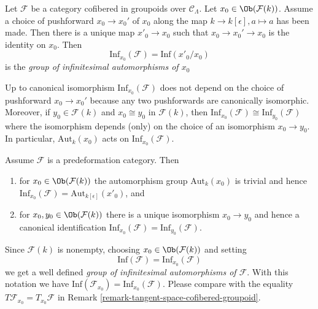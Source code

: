 \begin{definition}
\label{definition-infinitesimal-auts}
Let $\mathcal{F}$ be a category cofibered in groupoids over $\mathcal
C_\Lambda$. Let $x_0 \in \Ob(\mathcal{F}(k))$. Assume a choice of
pushforward $x_0 \to x_0'$ of $x_0$ along the map
$k \to k[\epsilon], a \mapsto a$ has been made.
Then there is a unique map $x'_0 \to x_0$ such that
$x_0 \to x_0' \to x_0$ is the identity on $x_0$.
Then
$$
\text{Inf}_{x_0}(\mathcal F) = \text{Inf}(x'_0/x_0)
$$
is the {\it group of infinitesimal automorphisms of $x_0$}
\end{definition}

\begin{remark}
\label{remark-choice-pushforward-immaterial-infinitesimal-aut}
Up to canonical isomorphism $\text{Inf}_{x_0}(\mathcal{F})$
does not depend on the choice of pushforward $x_0 \to x_0'$
because any two pushforwards are canonically isomorphic.
Moreover, if $y_0 \in \mathcal{F}(k)$ and $x_0 \cong y_0$ in
$\mathcal{F}(k)$, then
$\text{Inf}_{x_0}(\mathcal{F}) \cong \text{Inf}_{y_0}(\mathcal{F})$
where the isomorphism depends (only) on the choice of an isomorphism
$x_0 \to y_0$. In particular, $\text{Aut}_k(x_0)$
acts on $\text{Inf}_{x_0}(\mathcal{F})$.
\end{remark}

\begin{remark}
\label{remark-trivial-aut-point}
Assume $\mathcal{F}$ is a predeformation category. Then
\begin{enumerate}
\item for $x_0 \in \Ob(\mathcal{F}(k))$ the automorphism group
$\text{Aut}_k(x_0)$ is trivial and hence
$\text{Inf}_{x_0}(\mathcal{F}) = \text{Aut}_{k[\epsilon]}(x'_0)$, and
\item for $x_0, y_0 \in \Ob(\mathcal{F}(k))$ there is a unique
isomorphism $x_0 \to y_0$ and hence a canonical identification
$\text{Inf}_{x_0}(\mathcal{F}) = \text{Inf}_{y_0}(\mathcal{F})$.
\end{enumerate}
Since $\mathcal{F}(k)$ is nonempty, choosing $x_0 \in \Ob(\mathcal{F}(k))$
and setting
$$
\text{Inf}(\mathcal{F}) = \text{Inf}_{x_0}(\mathcal{F})
$$
we get a well defined {\it group of infinitesimal automorphisms
of $\mathcal{F}$}. With this notation we have
$\text{Inf}(\mathcal{F}_{x_0}) = \text{Inf}_{x_0}(\mathcal{F})$.
Please compare with the equality
$T\mathcal{F}_{x_0} = T_{x_0}\mathcal{F}$
in Remark \ref{remark-tangent-space-cofibered-groupoid}.
\end{remark}

